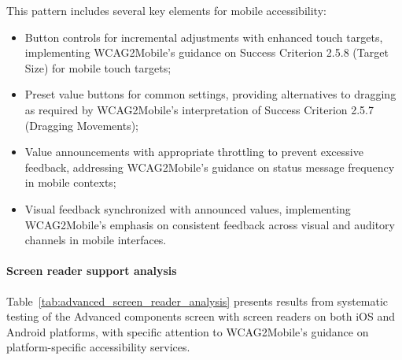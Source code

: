 This pattern includes several key elements for mobile accessibility:

\begin{itemize}
    \item Button controls for incremental adjustments with enhanced touch targets, implementing WCAG2Mobile's guidance on Success Criterion 2.5.8 (Target Size) for mobile touch targets;
    \item Preset value buttons for common settings, providing alternatives to dragging as required by WCAG2Mobile's interpretation of Success Criterion 2.5.7 (Dragging Movements);
    \item Value announcements with appropriate throttling to prevent excessive feedback, addressing WCAG2Mobile's guidance on status message frequency in mobile contexts;
    \item Visual feedback synchronized with announced values, implementing WCAG2Mobile's emphasis on consistent feedback across visual and auditory channels in mobile interfaces.
\end{itemize}

\paragraph{Screen reader support analysis}

Table~\ref{tab:advanced_screen_reader_analysis} presents results from systematic testing of the Advanced components screen with screen readers on both iOS and Android platforms, with specific attention to WCAG2Mobile's guidance on platform-specific accessibility services.

